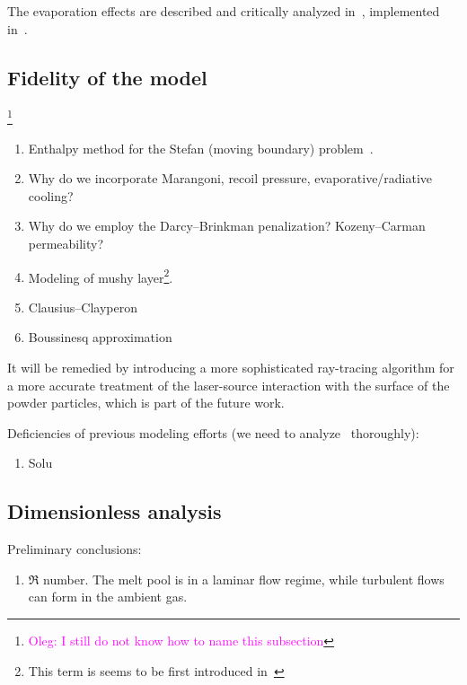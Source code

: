 \documentclass{article}
\newcommand{\oleg}[1]{\textcolor{magenta}{\footnote{\textcolor{magenta}{Oleg: #1}}}} %
\begin{document}
The evaporation effects are described and critically analyzed in~\cite{cook2019simulation}, implemented in~\cite{khairallah2016laser}.

\subsection{Fidelity of the model}\oleg{I still do not know how to name this subsection}

\begin{enumerate}
    \item Enthalpy method for the Stefan (moving boundary) problem~\cite{kamenomostskaja1961stefan, atthey1974finite, fedorenko1975difference, voller1981accurate}.
    \item Why do we incorporate Marangoni, recoil pressure, evaporative/radiative cooling?
    \item Why do we employ the Darcy--Brinkman penalization?\cite{voller1987fixed, le2006interfacial} Kozeny--Carman permeability?
    \item Modeling of mushy layer\footnote{This term is seems to be first introduced in~\cite{tien1967heat}}.
    \item Clausius--Clayperon~\cite{klassen2014evaporation, cook2019simulation}
    \item Boussinesq approximation
\end{enumerate}

It will be remedied by introducing a more sophisticated ray-tracing algorithm
for a more accurate treatment of the laser-source interaction with the surface of the powder particles,
which is part of the future work.

Deficiencies of previous modeling efforts (we need to analyze~\cite{cook2019simulation} thoroughly):
\begin{enumerate}
    \item Solu
\end{enumerate}

\subsection{Dimensionless analysis}

Preliminary conclusions:
\begin{enumerate}
    \item $\Re$ number. The melt pool is in a laminar flow regime, while  turbulent flows can form in the ambient gas.
\end{enumerate}
\end{document}
